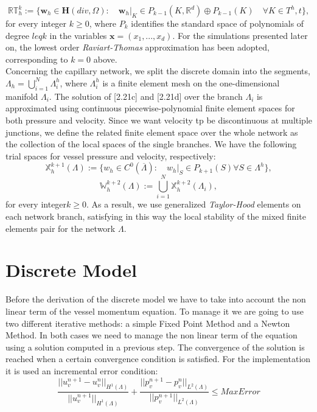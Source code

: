 \documentclass[a4paper]{report}
\begin{document}
\begin{equation}
\mathbb{RT}^k_h:=\{\mathbf{w}_h \in \mathbf{H}(div,\Omega) : \quad \mathbf{w}_h|_K \in \mathit{P}_{k-1} (K, \mathbb{R}^d)\oplus \mathit{P}_{k-1}(K) \quad \forall K \in T^h,t          \},
\end{equation}
for every integer $k \geq 0$, where $\mathit{P}_k$ identifies the standard space of polynomials of degree $leq k$ in  the variables $\mathbf{x}=(x_1,...,x_d)$. For the simulations presented later on, the lowest order {\it Raviart-Thomas} approximation has been adopted, corresponding to $k=0$ above.\\
Concerning the capillary network, we split the discrete domain into the segments, $\Lambda_h= \bigcup^N_{i=1}\Lambda^h_i$, where $\Lambda^h_i$  is a finite element mesh on the one-dimensional manifold $\Lambda_i$. The solution of [2.21c] and [2.21d] over the branch $\Lambda_i$ is approximated using continuous piecewise-polynomial finite element spaces for both pressure and velocity. Since we want velocity tp be discontinuous at multiple junctions, we define the related finite element space over the whole network as the collection of the local spaces of the single branches. We have the following trial spaces for vessel pressure and velocity, respectively:
\begin{equation}
\mathbb{X}^{k+1}_h(\Lambda):=\{ w_h \in C^0(\overline{\Lambda}): \quad w_h|_S \in \mathit{P}_{k+1} (S) \forall S \in \Lambda^h            \},
\end{equation}
\begin{equation}
\mathbb{W}^{k+2}_h(\Lambda):=\bigcup^N_{i=1} \mathbb{X}^{k+2}_h(\Lambda_i),
\end{equation}
for every integer$k \geq 0$. As a result, we use generalized  {\it Taylor-Hood} elements on each network branch, satisfying in this way the local stability of the mixed finite elements pair for the network $\Lambda$. 

\section{Discrete Model}
Before the derivation of the discrete model we have to take into account the non linear term of the vessel momentum equation.
To manage it we are going to use two different iterative methods: a simple Fixed Point Method and a Newton Method. In both cases we need to manage the non linear term of the equation using a solution computed in a previous step. The convergence of the solution  is reached when a certain convergence condition is satisfied. For the implementation it is used an incremental error condition:
\begin{equation}
\frac{||u_v^{n+1} - u_v^n||_{H^1(\Lambda)}}{||u_v^{n+1}||_{H^1(\Lambda)}}+\frac{||p_v^{n+1} - p_v^n||_{L^2(\Lambda)}}{||p_v^{n+1}||_{L^2(\Lambda)}}\leq MaxError
\end{equation}
\end{document}

